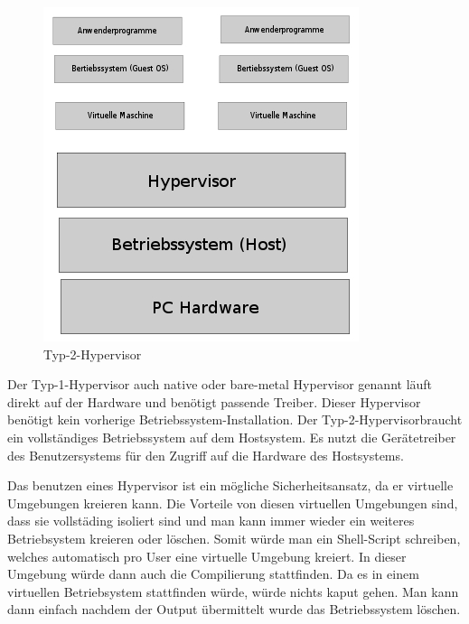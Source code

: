 \documentclass[10pt]{article}
\begin{document}
\begin{figure}[!tbp]
\begin{minipage}[b]{0.4\textwidth}
    \includegraphics[width=\textwidth]{Bilder/hypervisorTyp2.jpg}
    \caption{Typ-2-Hypervisor}
  \end{minipage}
\end{figure}
	
	Der Typ-1-Hypervisor auch native oder bare-metal Hypervisor genannt läuft direkt auf der Hardware und benötigt passende Treiber. Dieser Hypervisor benötigt kein vorherige Betriebssystem-Installation. 
	Der Typ-2-Hypervisorbraucht ein vollständiges Betriebssystem auf dem Hostsystem. Es nutzt die Gerätetreiber des Benutzersystems für den Zugriff auf die Hardware des Hostsystems. 
	
	Das benutzen eines Hypervisor ist ein mögliche Sicherheitsansatz, da er virtuelle Umgebungen kreieren kann. Die Vorteile von diesen virtuellen Umgebungen sind, dass sie vollstäding isoliert sind und man kann immer wieder ein weiteres Betriebsystem kreieren oder löschen. Somit würde man ein Shell-Script schreiben, welches automatisch pro User eine virtuelle Umgebung kreiert. In dieser Umgebung würde dann auch die Compilierung stattfinden. Da es in einem virtuellen Betriebsystem stattfinden würde, würde nichts kaput gehen. Man kann dann einfach nachdem der Output übermittelt wurde das Betriebssystem löschen.
	
\end{document}

